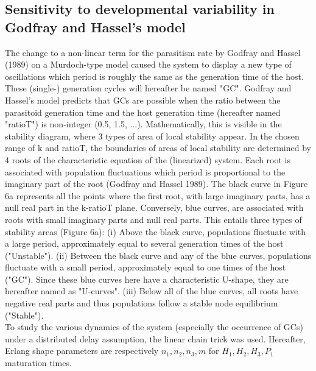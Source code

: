 \documentclass[12pt,a4paper,onecolumn]{article}
\begin{document}
\subsection{Sensitivity to developmental variability in Godfray and Hassel's model}
\tabto{1 cm} The change to a non-linear term for the parasitism rate by Godfray and Hassel (1989) on a Murdoch-type model caused the system to display a new type of oscillations which period is roughly the same as the generation time of the host. These (single-) generation cycles will hereafter be named "GC". Godfray and Hassel's model predicts that GCs are possible when the ratio between the parasitoid generation time and the host generation time (hereafter named "ratioT") is non-integer (0.5, 1.5, ...).  Mathematically, this is visible in the stability diagram,  where 3 types of area of local stability appear. In the chosen range of k and ratioT, the boundaries of  areas of local stability are determined by 4 roots of the characteristic equation of the (linearized) system. Each root is associated with population fluctuations which period is proportional to the imaginary part of the root (Godfray and Hassel 1989). The black curve in Figure 6a represents all the points where the first root, with large imaginary parts, has a null real part in the k-ratioT plane. Conversely, blue curves, are associated with roots with small imaginary parts and null real parts. This entails three types of stability areas (Figure 6a):
\tabto{1.5 cm} (i) Above the black curve, populations fluctuate with a large period, approximately equal to several generation times of the host ("Unstable").  
\tabto{1.5 cm} (ii) Between the black curve and any of the blue curves, populations fluctuate with a small period, approximately equal to one times of the host ("GC").  Since these blue curves here have a characteristic U-shape, they are hereafter named as "U-curves".
\tabto{1.5 cm} (iii) Below all of the blue curves, all roots have negative real parts and thus populations follow a stable node equilibrium ("Stable"). \\
To study the various dynamics of the system (especially the occurrence of GCs) under a distributed delay assumption, the linear chain trick was used. Hereafter, Erlang shape parameters are respectively $n_1, n_2, n_3, m$ for $H_1, H_2, H_3, P_1$ maturation times.
\end{document}
